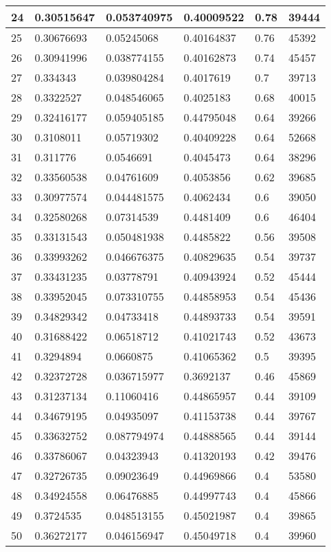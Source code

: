 \begin{longtable}{|l|l|l|l|l|l|}
24 & 0.30515647 & 0.053740975 & 0.40009522 & 0.78 & 39444 \\ \hline 
25 & 0.30676693 & 0.05245068 & 0.40164837 & 0.76 & 45392 \\ \hline 
26 & 0.30941996 & 0.038774155 & 0.40162873 & 0.74 & 45457 \\ \hline 
27 & 0.334343 & 0.039804284 & 0.4017619 & 0.7 & 39713 \\ \hline 
28 & 0.3322527 & 0.048546065 & 0.4025183 & 0.68 & 40015 \\ \hline 
29 & 0.32416177 & 0.059405185 & 0.44795048 & 0.64 & 39266 \\ \hline 
30 & 0.3108011 & 0.05719302 & 0.40409228 & 0.64 & 52668 \\ \hline 
31 & 0.311776 & 0.0546691 & 0.4045473 & 0.64 & 38296 \\ \hline 
32 & 0.33560538 & 0.04761609 & 0.4053856 & 0.62 & 39685 \\ \hline 
33 & 0.30977574 & 0.044481575 & 0.4062434 & 0.6 & 39050 \\ \hline 
34 & 0.32580268 & 0.07314539 & 0.4481409 & 0.6 & 46404 \\ \hline 
35 & 0.33131543 & 0.050481938 & 0.4485822 & 0.56 & 39508 \\ \hline 
36 & 0.33993262 & 0.046676375 & 0.40829635 & 0.54 & 39737 \\ \hline 
37 & 0.33431235 & 0.03778791 & 0.40943924 & 0.52 & 45444 \\ \hline 
38 & 0.33952045 & 0.073310755 & 0.44858953 & 0.54 & 45436 \\ \hline 
39 & 0.34829342 & 0.04733418 & 0.44893733 & 0.54 & 39591 \\ \hline 
40 & 0.31688422 & 0.06518712 & 0.41021743 & 0.52 & 43673 \\ \hline 
41 & 0.3294894 & 0.0660875 & 0.41065362 & 0.5 & 39395 \\ \hline 
42 & 0.32372728 & 0.036715977 & 0.3692137 & 0.46 & 45869 \\ \hline 
43 & 0.31237134 & 0.11060416 & 0.44865957 & 0.44 & 39109 \\ \hline 
44 & 0.34679195 & 0.04935097 & 0.41153738 & 0.44 & 39767 \\ \hline 
45 & 0.33632752 & 0.087794974 & 0.44888565 & 0.44 & 39144 \\ \hline 
46 & 0.33786067 & 0.04323943 & 0.41320193 & 0.42 & 39476 \\ \hline 
47 & 0.32726735 & 0.09023649 & 0.44969866 & 0.4 & 53580 \\ \hline 
48 & 0.34924558 & 0.06476885 & 0.44997743 & 0.4 & 45866 \\ \hline 
49 & 0.3724535 & 0.048513155 & 0.45021987 & 0.4 & 39865 \\ \hline 
50 & 0.36272177 & 0.046156947 & 0.45049718 & 0.4 & 39960 \\ \hline 
\end{longtable}